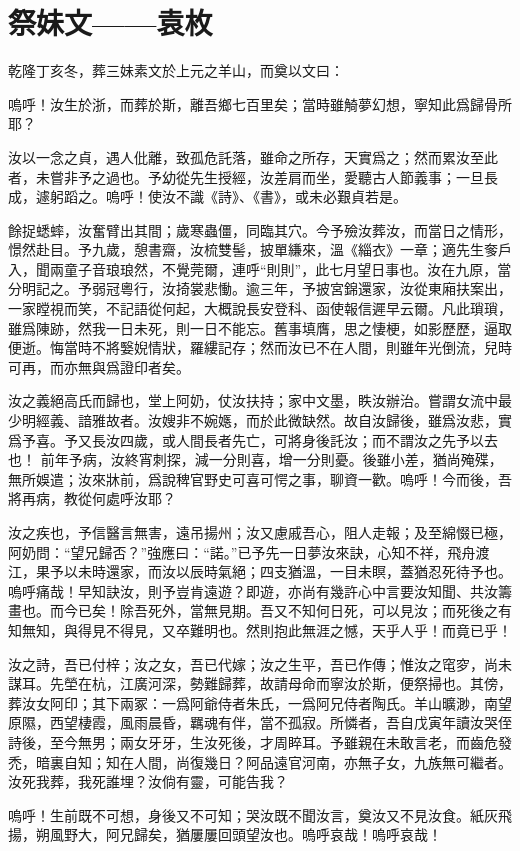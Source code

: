 \section{祭妹文——袁枚}

乾隆丁亥冬，葬三妹素文於上元之羊山，而奠以文曰：

嗚呼！汝生於浙，而葬於斯，離吾鄉七百里矣；當時雖觭夢幻想，寧知此爲歸骨所耶？

汝以一念之貞，遇人仳離，致孤危託落，雖命之所存，天實爲之；然而累汝至此者，未嘗非予之過也。予幼從先生授經，汝差肩而坐，愛聽古人節義事；一旦長成，遽躬蹈之。嗚呼！使汝不識《詩》、《書》，或未必艱貞若是。

餘捉蟋蟀，汝奮臂出其間；歲寒蟲僵，同臨其穴。今予殮汝葬汝，而當日之情形，憬然赴目。予九歲，憩書齋，汝梳雙髻，披單縑來，溫《緇衣》一章；適先生奓戶入，聞兩童子音琅琅然，不覺莞爾，連呼“則則”，此七月望日事也。汝在九原，當分明記之。予弱冠粵行，汝掎裳悲慟。逾三年，予披宮錦還家，汝從東廂扶案出，一家瞠視而笑，不記語從何起，大概說長安登科、函使報信遲早云爾。凡此瑣瑣，雖爲陳跡，然我一日未死，則一日不能忘。舊事填膺，思之悽梗，如影歷歷，逼取便逝。悔當時不將嫛婗情狀，羅縷記存；然而汝已不在人間，則雖年光倒流，兒時可再，而亦無與爲證印者矣。

汝之義絕高氏而歸也，堂上阿奶，仗汝扶持；家中文墨，眣汝辦治。嘗謂女流中最少明經義、諳雅故者。汝嫂非不婉嫕，而於此微缺然。故自汝歸後，雖爲汝悲，實爲予喜。予又長汝四歲，或人間長者先亡，可將身後託汝；而不謂汝之先予以去也！
前年予病，汝終宵刺探，減一分則喜，增一分則憂。後雖小差，猶尚殗殜，無所娛遣；汝來牀前，爲說稗官野史可喜可愕之事，聊資一歡。嗚呼！今而後，吾將再病，教從何處呼汝耶？

汝之疾也，予信醫言無害，遠吊揚州；汝又慮戚吾心，阻人走報；及至綿惙已極，阿奶問：“望兄歸否？”強應曰：“諾。”已予先一日夢汝來訣，心知不祥，飛舟渡江，果予以未時還家，而汝以辰時氣絕；四支猶溫，一目未瞑，蓋猶忍死待予也。嗚呼痛哉！早知訣汝，則予豈肯遠遊？即遊，亦尚有幾許心中言要汝知聞、共汝籌畫也。而今已矣！除吾死外，當無見期。吾又不知何日死，可以見汝；而死後之有知無知，與得見不得見，又卒難明也。然則抱此無涯之憾，天乎人乎！而竟已乎！

汝之詩，吾已付梓；汝之女，吾已代嫁；汝之生平，吾已作傳；惟汝之窀穸，尚未謀耳。先塋在杭，江廣河深，勢難歸葬，故請母命而寧汝於斯，便祭掃也。其傍，葬汝女阿印；其下兩冢：一爲阿爺侍者朱氏，一爲阿兄侍者陶氏。羊山曠渺，南望原隰，西望棲霞，風雨晨昏，羈魂有伴，當不孤寂。所憐者，吾自戊寅年讀汝哭侄詩後，至今無男；兩女牙牙，生汝死後，才周睟耳。予雖親在未敢言老，而齒危發禿，暗裏自知；知在人間，尚復幾日？阿品遠官河南，亦無子女，九族無可繼者。汝死我葬，我死誰埋？汝倘有靈，可能告我？

嗚呼！生前既不可想，身後又不可知；哭汝既不聞汝言，奠汝又不見汝食。紙灰飛揚，朔風野大，阿兄歸矣，猶屢屢回頭望汝也。嗚呼哀哉！嗚呼哀哉！